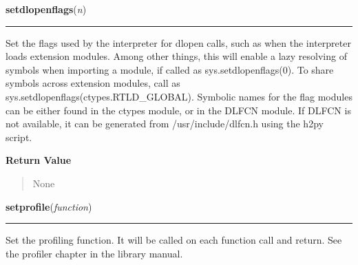 \hspace{.8\funcindent}\begin{boxedminipage}{\funcwidth}

    \raggedright \textbf{setdlopenflags}(\textit{n})

    \vspace{-1.5ex}

    \rule{\textwidth}{0.5\fboxrule}
\setlength{\parskip}{2ex}
    Set the flags used by the interpreter for dlopen calls, such as when 
    the interpreter loads extension modules.  Among other things, this will
    enable a lazy resolving of symbols when importing a module, if called 
    as sys.setdlopenflags(0).  To share symbols across extension modules, 
    call as sys.setdlopenflags(ctypes.RTLD\_GLOBAL).  Symbolic names for 
    the flag modules can be either found in the ctypes module, or in the 
    DLFCN module. If DLFCN is not available, it can be generated from 
    /usr/include/dlfcn.h using the h2py script.

\setlength{\parskip}{1ex}
      \textbf{Return Value}
    \vspace{-1ex}

      \begin{quote}
      None

      \end{quote}

    \end{boxedminipage}

    \label{sys:setprofile}

    \vspace{0.5ex}

\hspace{.8\funcindent}\begin{boxedminipage}{\funcwidth}

    \raggedright \textbf{setprofile}(\textit{function})

    \vspace{-1.5ex}

    \rule{\textwidth}{0.5\fboxrule}
\setlength{\parskip}{2ex}
    Set the profiling function.  It will be called on each function call 
    and return.  See the profiler chapter in the library manual.

\setlength{\parskip}{1ex}
    \end{boxedminipage}

    \label{sys:setrecursionlimit}

